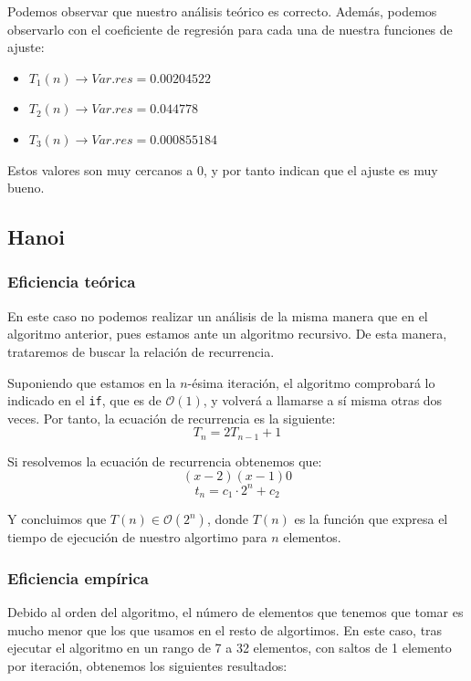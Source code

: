 \documentclass[10pt,a4paper]{article}
\begin{document}
Podemos observar que nuestro análisis teórico es correcto. Además, podemos observarlo con el coeficiente de regresión para cada una de nuestra funciones de ajuste:
\begin{itemize}
	\item \(T_1(n) \longrightarrow Var.res = 0.00204522\)
	\item \(T_2(n) \longrightarrow Var.res = 0.044778\)
	\item \(T_3(n) \longrightarrow Var.res = 0.000855184\)
\end{itemize}

Estos valores son muy cercanos a 0, y por tanto indican que el ajuste es muy bueno.
\subsection{Hanoi}


\subsubsection{Eficiencia teórica}

En este caso no podemos realizar un análisis de la misma manera que en el algoritmo anterior, pues estamos ante un algoritmo recursivo. De esta manera, trataremos de buscar la relación de recurrencia.

Suponiendo que estamos en la \(n\)-ésima iteración, el algoritmo comprobará lo indicado en el \texttt{if}, que es de \(\mathcal{O}(1)\), y volverá a llamarse a sí misma otras dos veces. Por tanto, la ecuación de recurrencia es la siguiente:
\[
	T_n = 2T_{n-1} + 1
\]

Si resolvemos la ecuación de recurrencia obtenemos que:
\[
	(x-2)(x-1) 0
\]
\[
	t_n = c_1 \cdot 2^n + c_2
\]

Y concluimos que \(T(n) \in \mathcal{O}(2^n)\), donde \(T(n)\) es la función que expresa el tiempo de ejecución de nuestro algortimo para \(n\) elementos.

\subsubsection{Eficiencia empírica}
Debido al orden del algoritmo, el número de elementos que tenemos que tomar es mucho menor que los que usamos en el resto de algortimos. En este caso, tras ejecutar el algoritmo en un rango de 7 a 32 elementos, con saltos de 1 elemento por iteración, obtenemos los siguientes resultados:
\end{document}
